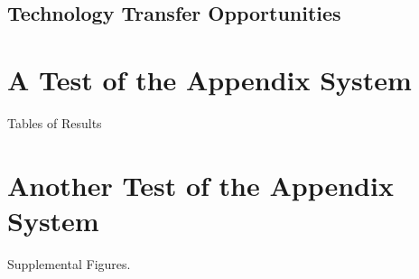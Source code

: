 \documentclass{erauthesis}
\begin{document}
\section{Technology Transfer Opportunities}





% 


\backmatter

\chapter{A Test of the Appendix System}

Tables of Results

\chapter{Another Test of the Appendix System}
Supplemental Figures.
\end{document}

